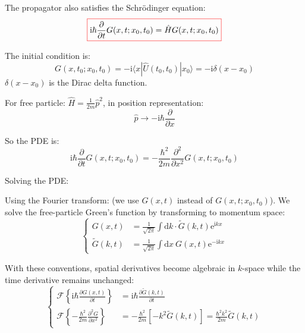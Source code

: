 The propagator also satisfies the Schrödinger equation:
\begin{equation}
    \colorboxed{\mathrm{i}\hbar \frac{\partial}{\partial t} G(x, t; x_0, t_0) = \hat{H} G(x, t; x_0, t_0)}
\end{equation}

The initial condition is:
\begin{equation}
G(x, t_0; x_0, t_0) = -\mathrm{i} \langle x | \hat{U}(t_0, t_0) | x_0 \rangle = -\mathrm{i} \delta(x-x_0)
\end{equation}
$\delta(x-x_0)$ is the Dirac delta function.

\begin{example}

    For free particle: $\hat{H} = \frac{1}{2m}\hat{p}^2$, in position representation:
    \begin{equation}
    \hat{p} \to -\mathrm{i}\hbar \frac{\partial}{\partial x}
    \end{equation}

    So the PDE is:
    \begin{equation}
    \mathrm{i}\hbar \frac{\partial}{\partial t} G(x, t; x_0, t_0) = -\frac{\hbar^2}{2m} \frac{\partial^2}{\partial x^2} G(x, t; x_0, t_0)
    \end{equation}

    Solving the PDE:

    Using the Fourier transform: (we use $G(x,t)$ instead of $G(x,t;x_0,t_0)$). We solve the free-particle Green's function by transforming to momentum space:
    \begin{equation}
        \left\{
        \begin{aligned}
        G(x, t) &= \frac{1}{\sqrt{2\pi}} \int \mathrm{d}k \cdot \tilde{G}(k,t) \mathrm{e}^{\mathrm{i}kx} \\
        \tilde{G}(k, t) &= \frac{1}{\sqrt{2\pi}} \int \mathrm{d}x \ G(x,t) \mathrm{e}^{-\mathrm{i}kx}
        \end{aligned}
        \right.
    \end{equation}

    With these conventions, spatial derivatives become algebraic in $k$-space while the time derivative remains unchanged:
    \begin{equation}
        \left\{
        \begin{aligned}
        \mathcal{F}\left\{ \mathrm{i}\hbar \frac{\partial G(x,t)}{\partial t} \right\} &= \mathrm{i}\hbar \frac{\partial \tilde{G}(k,t)}{\partial t} \\
        \mathcal{F}\left\{ -\frac{\hbar^2}{2m} \frac{\partial^2 G}{\partial x^2} \right\} &= -\frac{\hbar^2}{2m} [ -k^2 \tilde{G}(k,t) ] = \frac{\hbar^2 k^2}{2m} \tilde{G}(k,t)
        \end{aligned}
        \right.
    \end{equation}


\end{example}
